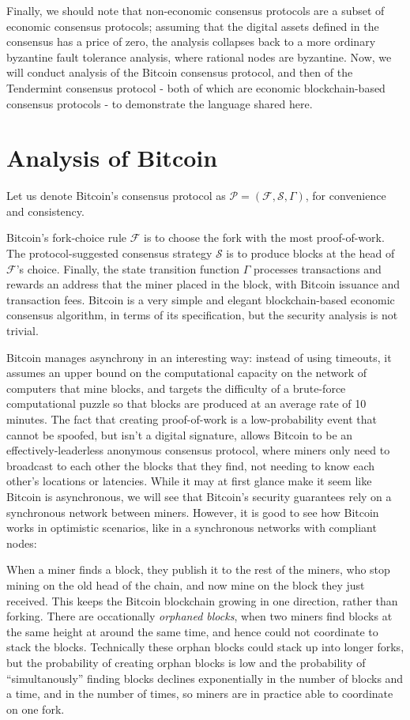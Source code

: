 \documentclass[11pt,a4paper]{article}
\theoremstyle{plain}
\theoremstyle{definition}
\begin{document}
Finally, we should note that non-economic consensus protocols are a subset of economic consensus protocols; assuming that the digital assets defined in the consensus has a price of zero, the analysis collapses back to a more ordinary byzantine fault tolerance analysis, where rational nodes are byzantine. Now, we will conduct analysis of the Bitcoin consensus protocol, and then of the Tendermint consensus protocol - both of which are economic blockchain-based consensus protocols - to demonstrate the language shared here.



\section{Analysis of Bitcoin}

Let us denote Bitcoin's consensus protocol as $\mathcal{P} = (\mathcal{F}, \mathcal{S}, \Gamma)$, for convenience and consistency. 

Bitcoin's fork-choice rule $\mathcal{F}$ is to choose the fork with the most proof-of-work. The protocol-suggested consensus strategy $\mathcal{S}$ is to produce blocks at the head of $\mathcal{F}$'s choice. Finally, the state transition function $\Gamma$ processes transactions and rewards an address that the miner placed in the block, with Bitcoin issuance and transaction fees. Bitcoin is a very simple and elegant blockchain-based economic consensus algorithm, in terms of its specification, but the security analysis is not trivial.

Bitcoin manages asynchrony in an interesting way: instead of using timeouts, it assumes an upper bound on the computational capacity on the network of computers that mine blocks, and targets the difficulty of a brute-force computational puzzle so that blocks are produced at an average rate of 10 minutes. The fact that creating proof-of-work is a low-probability event that cannot be spoofed, but isn't a digital signature, allows Bitcoin to be an effectively-leaderless anonymous consensus protocol, where miners only need to broadcast to each other the blocks that they find, not needing to know each other's locations or latencies. While it may at first glance make it seem like Bitcoin is asynchronous, we will see that Bitcoin's security guarantees rely on a synchronous network between miners. However, it is good to see how Bitcoin works in optimistic scenarios, like in a synchronous networks with compliant nodes:

When a miner finds a block, they publish it to the rest of the miners, who stop mining on the old head of the chain, and now mine on the block they just received. This keeps the Bitcoin blockchain growing in one direction, rather than forking. There are occationally \emph{orphaned blocks}, when two miners find blocks at the same height at around the same time, and hence could not coordinate to stack the blocks. Technically these orphan blocks could stack up into longer forks, but the probability of creating orphan blocks is low and the probability of ``simultanously'' finding blocks declines exponentially in the number of blocks and a time, and in the number of times, so miners are in practice able to coordinate on one fork.
\end{document}
